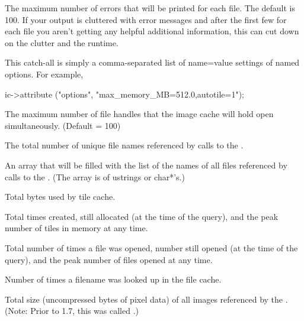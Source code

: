 The maximum number of errors that will be printed for each file. The default
is 100. If your output is cluttered with error messages and after the first
few for each file you aren't getting any helpful additional information,
this can cut down on the clutter and the runtime.
\apiend

This catch-all is simply a comma-separated list of {\cf name=value}
settings of named options.  For example,
\begin{code}
        ic->attribute ("options", "max_memory_MB=512.0,autotile=1");
\end{code}
\apiend

The maximum number of file handles that the image cache will
hold open simultaneously.  (Default = 100)
\apiend

The total number of unique file names referenced by calls to the \ImageCache.
\apiend

An array that will be filled with the list of the names of all files
referenced by calls to the \ImageCache. (The array is of {\cf ustring}s or
{\cf char*}'s.)
\apiend

Total bytes used by tile cache.
\apiend

Total times created, still allocated (at the time of the query), and the
peak number of tiles in memory at any time.
\apiend

Total number of times a file was opened, number still opened (at the time of
the query), and the peak number of files opened at any time.
\apiend

Number of times a filename was looked up in the file cache.
\apiend

Total size (uncompressed bytes of pixel data) of all images referenced
by the \ImageCache. (Note: Prior to 1.7, this was called .)
\apiend

